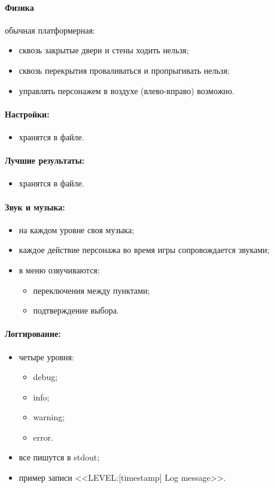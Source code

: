 \documentclass[12pt,a4paper,fullpage]{article}
\begin{document}
\paragraph{Физика} обычная платформерная:
\begin{itemize}
	\item сквозь закрытые двери и стены ходить нельзя;
	\item сквозь перекрытия проваливаться и пропрыгивать нельзя;
	\item управлять персонажем в воздухе (влево-вправо) возможно.
\end{itemize}

\paragraph{Настройки:}
\begin{itemize}
	\item хранятся в файле.
\end{itemize}

\paragraph{Лучшие результаты:}
\begin{itemize}
	\item хранятся в файле.
\end{itemize}

\paragraph{Звук и музыка:}
\begin{itemize}
	\item на каждом уровне своя музыка;
	\item каждое действие персонажа во время игры сопровождается звуками;
	\item в меню озвучиваются:
	\begin{itemize}
		\item переключения между пунктами;
		\item подтверждение выбора.
	\end{itemize}
\end{itemize}

\paragraph{Логгирование:}
\begin{itemize}
	\item четыре уровня:
	\begin{itemize}
		\item debug;
		\item info;
		\item warning;
		\item error.
	\end{itemize}
	\item все пишутся в stdout;
	\item пример записи <<LEVEL:[timestamp] Log message>>.
\end{itemize}
\end{document}
